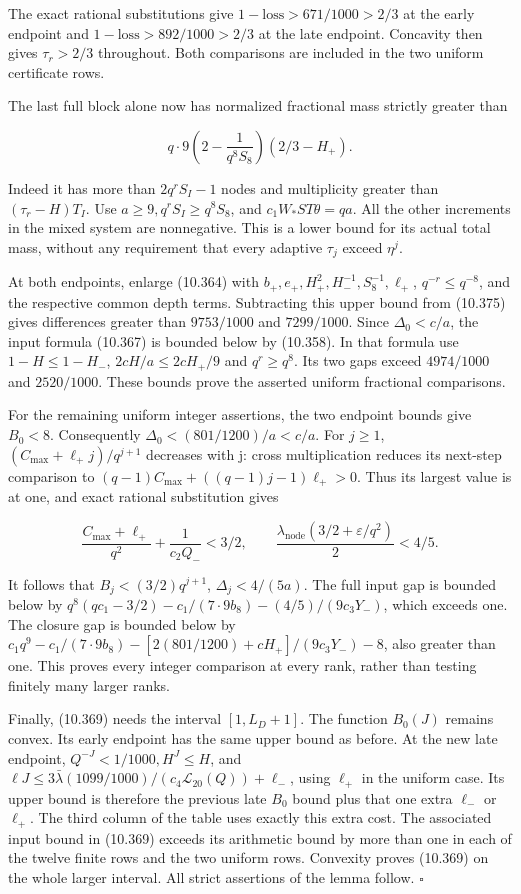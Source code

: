 \documentclass[
  11pt,
  a4paper,
]{article}
\begin{document}
The exact rational substitutions give \(1-\text{loss}>671/1000>2/3\) at
the early endpoint and \(1-\text{loss}>892/1000>2/3\) at the late
endpoint. Concavity then gives \(\tau_r>2/3\) throughout. Both
comparisons are included in the two uniform certificate rows.

The last full block alone now has normalized fractional mass strictly
greater than

\[
q\cdot9\left(2-\frac1{q^8S_8}\right)(2/3-H_+).
\tag{10.375}
\]

Indeed it has more than \(2q^rS_I-1\) nodes and multiplicity greater
than \((\tau_r-H)T_I\). Use \(a\ge9,q^rS_I\ge q^8S_8\), and
\(c_1W_*ST\theta=qa\). All the other increments in the mixed system are
nonnegative. This is a lower bound for its actual total mass, without
any requirement that every adaptive \(\tau_j\) exceed \(\eta^j\).

At both endpoints, enlarge (10.364) with
\(b_+,e_+,H_+^2,H_-^{-1},S_8^{-1},\ell_+\), \(q^{-r}\le q^{-8}\), and
the respective common depth terms. Subtracting this upper bound from
(10.375) gives differences greater than \(9753/1000\) and \(7299/1000\).
Since \(\Delta_0<c/a\), the input formula (10.367) is bounded below by
(10.358). In that formula use \(1-H\le1-H_-\), \(2cH/a\le2cH_+/9\) and
\(q^r\ge q^8\). Its two gaps exceed \(4974/1000\) and \(2520/1000\).
These bounds prove the asserted uniform fractional comparisons.

For the remaining uniform integer assertions, the two endpoint bounds
give \(B_0<8\). Consequently \(\Delta_0<(801/1200)/a<c/a\). For
\(j\ge1\), \((C_{\max}+\ell_+j)/q^{j+1}\) decreases with j: cross
multiplication reduces its next-step comparison to
\((q-1)C_{\max}+((q-1)j-1)\ell_+>0\). Thus its largest value is at one,
and exact rational substitution gives

\[
\frac{C_{\max}+\ell_+}{q^2}+\frac1{c_2Q_-}<3/2,
\qquad
\frac{\lambda_{\mathrm{node}}(3/2+\varepsilon/q^2)}2<4/5.
\tag{10.376}
\]

It follows that \(B_j<(3/2)q^{j+1}\), \(\Delta_j<4/(5a)\). The full
input gap is bounded below by
\(q^8(qc_1-3/2)-c_1/(7\cdot9b_8)-(4/5)/(9c_3Y_-)\), which exceeds one.
The closure gap is bounded below by
\(c_1q^9-c_1/(7\cdot9b_8)-[2(801/1200)+cH_+]/(9c_3Y_-)-8\), also greater
than one. This proves every integer comparison at every rank, rather
than testing finitely many larger ranks.

Finally, (10.369) needs the interval \([1,L_D+1]\). The function
\(B_0(J)\) remains convex. Its early endpoint has the same upper bound
as before. At the new late endpoint, \(Q^{-J}<1/1000,H^J\le H\), and
\(\ell J\le3\bar\lambda(1099/1000)/(c_4\mathcal L_{20}(Q))+\ell_-\),
using \(\ell_+\) in the uniform case. Its upper bound is therefore the
previous late \(B_0\) bound plus that one extra \(\ell_-\) or
\(\ell_+\). The third column of the table uses exactly this extra cost.
The associated input bound in (10.369) exceeds its arithmetic bound by
more than one in each of the twelve finite rows and the two uniform
rows. Convexity proves (10.369) on the whole larger interval. All strict
assertions of the lemma follow. \(\square\)
\end{document}
